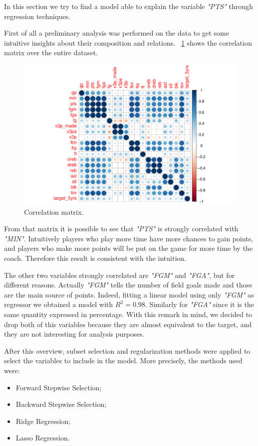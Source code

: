 In this section we try to find a model able to explain the variable \textit{"PTS"} through regression techniques.

First of all a preliminary analysis was performed on the data to get some intuitive insights about their composition and relations.
\Fig~\ref{fig:CorrMatrix} shows the correlation matrix over the entire dataset.
\begin{figure}[h]
	\centering
	\includegraphics[width=0.5\linewidth]{ImageFiles/Regression/CorrMatrix}
	\caption{Correlation matrix.}
	\label{fig:CorrMatrix}
\end{figure}

From that matrix it is possible to see that \textit{"PTS"} is strongly correlated with \textit{"MIN"}. Intuitively players who play more time have more chances to gain points, and players who make more points will be put on the game for more time by the coach. Therefore this result is consistent with the intuition.

The other two variables strongly correlated are \textit{"FGM"} and \textit{"FGA"}, but for different reasons. Actually \textit{"FGM"} tells the number of field goals made and those are the main source of points. Indeed, fitting a linear model using only \textit{"FGM"} as regressor we obtained a model with $R^2 = 0.98$. Similarly for \textit{"FGA"} since it is the same quantity expressed in percentage. With this remark in mind, we decided to drop both of this variables because they are almost equivalent to the target, and they are not interesting for analysis purposes.

After this overview, subset selection and regularization methods were applied to select the variables to include in the model. More precisely, the methods used were:
\begin{itemize}
	\item Forward Stepwise Selection;
	\item Backward Stepwise Selection;
	\item Ridge Regression;
	\item Lasso Regression.
\end{itemize}

